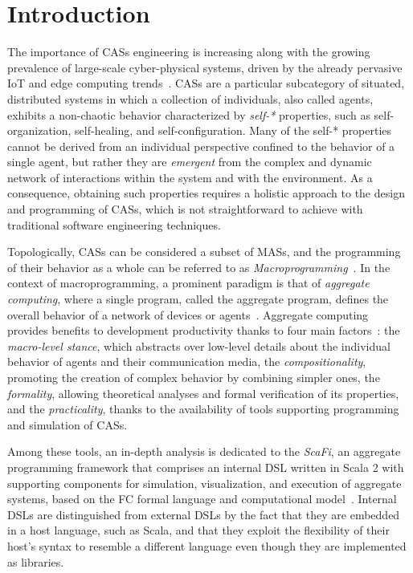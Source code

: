 \chapter{Introduction}
\label{chap:introduction}

The importance of \acp{CAS} engineering is increasing along with the growing prevalence of large-scale cyber-physical systems, driven by the already pervasive \ac{IoT} and edge computing trends~\cite{collective,pervasive}.
%
\acp{CAS} are a particular subcategory of situated, distributed systems in which a collection of individuals, also called agents, exhibits a non-chaotic behavior characterized by \textit{self-*} properties, such as self-organization, self-healing, and self-configuration.
%
Many of the self-* properties cannot be derived from an individual perspective confined to the behavior of a single agent, but rather they are \textit{emergent} from the complex and dynamic network of interactions within the system and with the environment.
%
As a consequence, obtaining such properties requires a holistic approach to the design and programming of \acp{CAS}, which is not straightforward to achieve with traditional software engineering techniques.

Topologically, \acp{CAS} can be considered a subset of \acp{MAS}, and the programming of their behavior as a whole can be referred to as \textit{Macroprogramming}~\cite{macroprogramming-state-of-the-art}.
%
In the context of macroprogramming, a prominent paradigm is that of \textit{aggregate computing}, where a single program, called the aggregate program, defines the overall behavior of a network of devices or agents~\cite{macroprogramming-state-of-the-art}.
%
Aggregate computing provides benefits to development productivity thanks to four main factors~\cite{scafi}: the \textit{macro-level stance}, which abstracts over low-level details about the individual behavior of agents and their communication media, the \textit{compositionality}, promoting the creation of complex behavior by combining simpler ones, the \textit{formality}, allowing theoretical analyses and formal verification of its properties, and the \textit{practicality}, thanks to the availability of tools supporting programming and simulation of \acp{CAS}.

Among these tools, an in-depth analysis is dedicated to the \textit{ScaFi}, an aggregate programming framework that comprises an internal \ac{DSL} written in Scala 2 with supporting components for simulation, visualization, and execution of aggregate systems, based on the \ac{FC} formal language and computational model~\cite{scafi}.
%
Internal \acp{DSL} are distinguished from external \acp{DSL} by the fact that they are embedded in a host language, such as Scala, and that they exploit the flexibility of their host's syntax to resemble a different language even though they are implemented as libraries.

